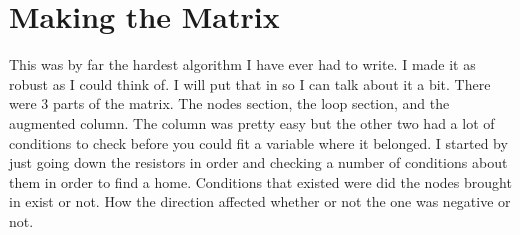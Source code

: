 \documentclass{article}
\begin{document}
\section*{Making the Matrix}

This was by far the hardest algorithm I have ever had to write. I made it as robust as I could think of. I will put that in so I can talk about it a bit. There were 3 parts of the matrix. The nodes section, the loop section, and the augmented column. The column was pretty easy but the other two had a lot of conditions to check before you could fit a variable where it belonged. I started by just going down the resistors in order and checking a number of conditions about them in order to find a home. Conditions that existed were did the nodes brought in exist or not. How the direction affected whether or not the one was negative or not.
\end{document}
